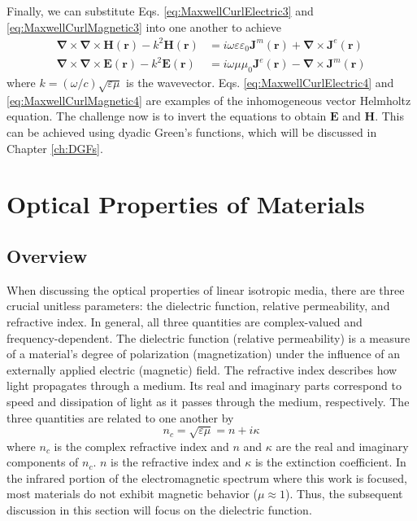Finally, we can substitute Eqs. \ref{eq:MaxwellCurlElectric3} and \ref{eq:MaxwellCurlMagnetic3} into one another to achieve
\begin{subequations}
\begin{align}
\boldsymbol{\nabla} \times \boldsymbol{\nabla} \times \boldsymbol{H}(\boldsymbol{r}) - k^{2} \boldsymbol{H}(\boldsymbol{r}) &= i \omega \varepsilon \varepsilon_{0} \boldsymbol{J}^m(\boldsymbol{r}) + \boldsymbol{\nabla} \times  \boldsymbol{J}^e(\boldsymbol{r}) \label{eq:MaxwellCurlElectric4}
\\
\boldsymbol{\nabla} \times \boldsymbol{\nabla} \times \boldsymbol{E}(\boldsymbol{r}) - k^{2} \boldsymbol{E}(\boldsymbol{r})&= i \omega \mu \mu_{0} \boldsymbol{J}^e(\boldsymbol{r}) - \boldsymbol{\nabla} \times \boldsymbol{J}^m(\boldsymbol{r}) \label{eq:MaxwellCurlMagnetic4}
\end{align}
\end{subequations}
%
where $k = (\omega/c) \sqrt{\varepsilon \mu}$ is the wavevector. Eqs. \ref{eq:MaxwellCurlElectric4} and \ref{eq:MaxwellCurlMagnetic4} are examples of the inhomogeneous vector Helmholtz equation. The challenge now is to invert the equations to obtain $\boldsymbol{E}$ and $\boldsymbol{H}$. This can be achieved using dyadic Green's functions, which will be discussed in Chapter \ref{ch:DGFs}.


\section{Optical Properties of Materials} \label{sec:OpticalProperties}

\subsection{Overview}
%
When discussing the optical properties of linear isotropic media, there are three crucial unitless parameters: the dielectric function, relative permeability, and refractive index. In general, all three quantities are complex-valued and frequency-dependent. The dielectric function (relative permeability) is a measure of a material's degree of polarization (magnetization) under the influence of an externally applied electric (magnetic) field. The refractive index describes how light propagates through a medium. Its real and imaginary parts correspond to speed and dissipation of light as it passes through the medium, respectively. The three quantities are related to one another by
%
\begin{equation}
n_{c} = \sqrt{\varepsilon \mu} = n + i \kappa
\end{equation}
%
where $n_{c}$ is the complex refractive index and $n$ and $\kappa$ are the real and imaginary components of $n_{c}$. $n$ is the refractive index and $\kappa$ is the extinction coefficient. In the infrared portion of the electromagnetic spectrum where this work is focused, most materials do not exhibit magnetic behavior ($\mu \approx 1$). Thus, the subsequent discussion in this section will focus on the dielectric function. 


